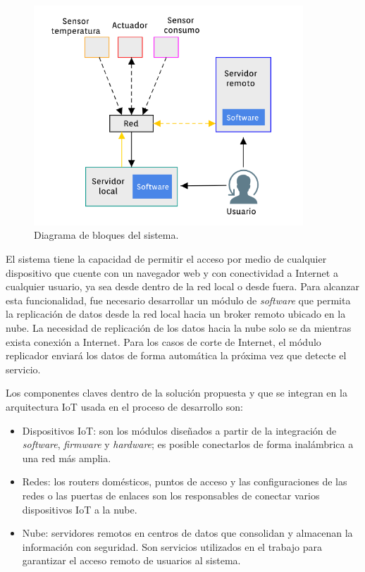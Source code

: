 \begin{figure}[htbp]
	\centering
	\includegraphics[width=0.9\textwidth]{./Figures/bloques.png}
	\caption{Diagrama de bloques del sistema.}

	\label{fig:diagrama1}
\end{figure}

El sistema tiene la capacidad de permitir el acceso por medio de cualquier dispositivo que cuente con un navegador web y con conectividad a Internet a cualquier usuario, ya sea desde dentro de la red local o desde fuera. Para alcanzar esta funcionalidad, fue necesario desarrollar un módulo de \emph{software} que permita la replicación de datos desde la red local hacia un broker remoto ubicado en la nube. La necesidad de replicación de los datos hacia la nube solo se da mientras exista conexión a Internet. Para los casos de corte de Internet, el módulo replicador enviará los datos de forma automática la próxima vez que detecte el servicio.%

Los componentes claves dentro de la solución propuesta y que se integran en la arquitectura IoT usada en el proceso de desarrollo son: 


\begin{itemize}
\item Dispositivos IoT: son los módulos diseñados a partir de la integración de \emph{software}, \emph{firmware} y \emph{hardware}; es posible conectarlos de forma inalámbrica a una red más amplia.
\item Redes: los routers domésticos, puntos de acceso y las configuraciones de las redes o las puertas de enlaces son los responsables de conectar varios dispositivos IoT a la nube.
\item Nube: servidores remotos en centros de datos que consolidan y almacenan la información con seguridad. Son servicios utilizados en el trabajo para garantizar el acceso remoto de usuarios al sistema.
\end{itemize}

